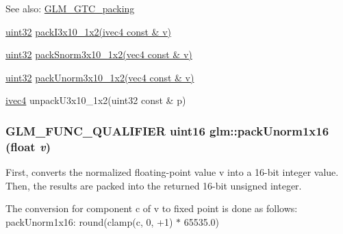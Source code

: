 \begin{Desc}
\item[See also:]\hyperlink{group__gtc__packing}{GLM\_\-GTC\_\-packing} 

\hyperlink{group__gtc__type__precision_g202b6a53c105fcb7e531f9b443518451}{uint32} \hyperlink{group__gtc__packing_g032e18fa5bc5b8f3897104aeb2f1e195}{packI3x10\_\-1x2(ivec4 const \& v)} 

\hyperlink{group__gtc__type__precision_g202b6a53c105fcb7e531f9b443518451}{uint32} \hyperlink{group__gtc__packing_g0d4157cec37c0312216a7be1cc92df54}{packSnorm3x10\_\-1x2(vec4 const \& v)} 

\hyperlink{group__gtc__type__precision_g202b6a53c105fcb7e531f9b443518451}{uint32} \hyperlink{group__gtc__packing_g2cf2d11b40bd48639110456fd74c2e33}{packUnorm3x10\_\-1x2(vec4 const \& v)} 

\hyperlink{group__core__types_ga4560ddc50320ea8f8a70d5c9c249fea}{ivec4} unpackU3x10\_\-1x2(uint32 const \& p) \end{Desc}
\hypertarget{group__gtc__packing_g60c7d915f5653559ae02c2f79a8c5c1d}{
\subsubsection[packUnorm1x16]{\setlength{\rightskip}{0pt plus 5cm}GLM\_\-FUNC\_\-QUALIFIER uint16 glm::packUnorm1x16 (float {\em v})}}
\label{group__gtc__packing_g60c7d915f5653559ae02c2f79a8c5c1d}


First, converts the normalized floating-point value v into a 16-bit integer value. Then, the results are packed into the returned 16-bit unsigned integer.

The conversion for component c of v to fixed point is done as follows: packUnorm1x16: round(clamp(c, 0, +1) $\ast$ 65535.0)


